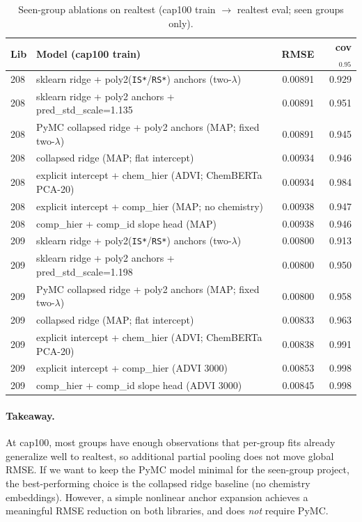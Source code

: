 \documentclass[11pt]{article}
\begin{document}
\begin{table}[H]
\centering
\begin{tabular}{llrr}
\toprule
Lib & Model (cap100 train) & RMSE & cov$_{0.95}$ \\
\midrule
208 & sklearn ridge + poly2(\texttt{IS*}/\texttt{RS*}) anchors (two-$\lambda$) & 0.00891 & 0.929 \\
208 & sklearn ridge + poly2 anchors + pred\_std\_scale=1.135 & 0.00891 & 0.951 \\
208 & PyMC collapsed ridge + poly2 anchors (MAP; fixed two-$\lambda$) & 0.00891 & 0.945 \\
208 & collapsed ridge (MAP; flat intercept) & 0.00934 & 0.946 \\
208 & explicit intercept + chem\_hier (ADVI; ChemBERTa PCA-20) & 0.00934 & 0.984 \\
208 & explicit intercept + comp\_hier (MAP; no chemistry) & 0.00938 & 0.947 \\
208 & comp\_hier + comp\_id slope head (MAP) & 0.00938 & 0.946 \\
\midrule
209 & sklearn ridge + poly2(\texttt{IS*}/\texttt{RS*}) anchors (two-$\lambda$) & 0.00800 & 0.913 \\
209 & sklearn ridge + poly2 anchors + pred\_std\_scale=1.198 & 0.00800 & 0.950 \\
209 & PyMC collapsed ridge + poly2 anchors (MAP; fixed two-$\lambda$) & 0.00800 & 0.958 \\
209 & collapsed ridge (MAP; flat intercept) & 0.00833 & 0.963 \\
209 & explicit intercept + chem\_hier (ADVI; ChemBERTa PCA-20) & 0.00838 & 0.991 \\
209 & explicit intercept + comp\_hier (ADVI 3000) & 0.00853 & 0.998 \\
209 & comp\_hier + comp\_id slope head (ADVI 3000) & 0.00845 & 0.998 \\
\bottomrule
\end{tabular}
\caption{Seen-group ablations on realtest (cap100 train $\rightarrow$ realtest eval; seen groups only).}
\end{table}

\paragraph{Takeaway.}
At cap100, most groups have enough observations that per-group fits already generalize well to realtest, so additional partial pooling
does not move global RMSE. If we want to keep the PyMC model minimal for the seen-group project, the best-performing choice is the
collapsed ridge baseline (no chemistry embeddings). However, a simple nonlinear anchor expansion achieves a meaningful RMSE reduction on
both libraries, and does \emph{not} require PyMC.
\end{document}
